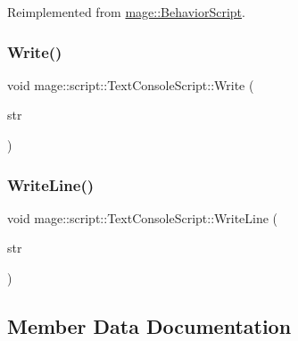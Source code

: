 Reimplemented from \mbox{\hyperlink{classmage_1_1_behavior_script_a085634661326b59850c1111e537baa4e}{mage\+::\+Behavior\+Script}}.

\mbox{\label{classmage_1_1script_1_1_text_console_script_a46610edcf7a1707476b87ad64f1ee68d}} 
\subsubsection{\texorpdfstring{Write()}{Write()}}
{\footnotesize\ttfamily void mage\+::script\+::\+Text\+Console\+Script\+::\+Write (\begin{DoxyParamCaption}\item[{\mbox{\hyperlink{namespacemage_a8769f9d670d6b585ea306cb1062af94b}{Not\+Null}}$<$ \mbox{\hyperlink{namespacemage_ac409e0f2a22292a3a4cd42742994fbf0}{const\+\_\+wzstring}} $>$}]{str }\end{DoxyParamCaption})}

\mbox{\label{classmage_1_1script_1_1_text_console_script_ac8f0361bc1d703b56f1d8be43a32f0ae}} 
\subsubsection{\texorpdfstring{Write\+Line()}{WriteLine()}}
{\footnotesize\ttfamily void mage\+::script\+::\+Text\+Console\+Script\+::\+Write\+Line (\begin{DoxyParamCaption}\item[{\mbox{\hyperlink{namespacemage_a8769f9d670d6b585ea306cb1062af94b}{Not\+Null}}$<$ \mbox{\hyperlink{namespacemage_ac409e0f2a22292a3a4cd42742994fbf0}{const\+\_\+wzstring}} $>$}]{str }\end{DoxyParamCaption})}



\subsection{Member Data Documentation}
\mbox{\label{classmage_1_1script_1_1_text_console_script_a35db160ce89d4ebf6f184d2fe850beab}} 
